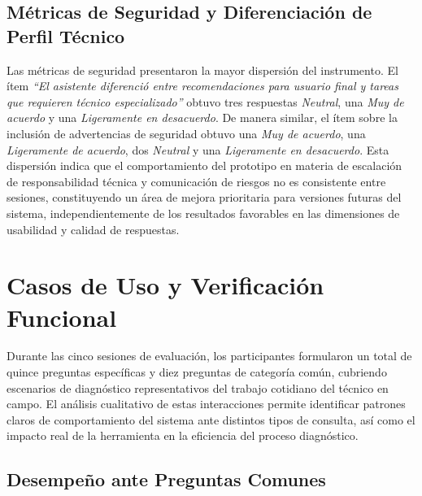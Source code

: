{{\subsection{Métricas de Seguridad y Diferenciación de Perfil Técnico}

Las métricas de seguridad presentaron la mayor dispersión del instrumento. El ítem \textit{``El asistente diferenció entre recomendaciones para usuario final y tareas que requieren técnico especializado''} obtuvo tres respuestas \textit{Neutral}, una \textit{Muy de acuerdo} y una \textit{Ligeramente en desacuerdo}. De manera similar, el ítem sobre la inclusión de advertencias de seguridad obtuvo una \textit{Muy de acuerdo}, una \textit{Ligeramente de acuerdo}, dos \textit{Neutral} y una \textit{Ligeramente en desacuerdo}. Esta dispersión indica que el comportamiento del prototipo en materia de escalación de responsabilidad técnica y comunicación de riesgos no es consistente entre sesiones, constituyendo un área de mejora prioritaria para versiones futuras del sistema, independientemente de los resultados favorables en las dimensiones de usabilidad y calidad de respuestas.


\section{Casos de Uso y Verificación Funcional}

Durante las cinco sesiones de evaluación, los participantes formularon un total de quince preguntas específicas y diez preguntas de categoría común, cubriendo escenarios de diagnóstico representativos del trabajo cotidiano del técnico en campo. El análisis cualitativo de estas interacciones permite identificar patrones claros de comportamiento del sistema ante distintos tipos de consulta, así como el impacto real de la herramienta en la eficiencia del proceso diagnóstico.

\subsection{Desempeño ante Preguntas Comunes}

}}
